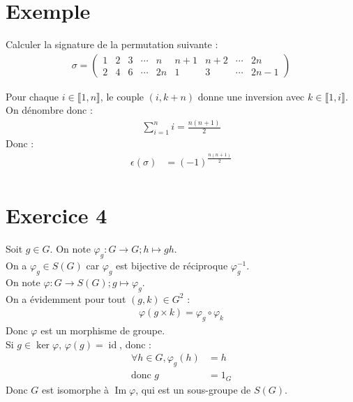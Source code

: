 \documentclass[../main.tex]{subfiles}
\begin{document}
\section{Exemple}
\begin{tcolorbox}[title=Exemple 29.69, title filled=false, colframe=darkgreen, colback=darkgreen!10!white]
    Calculer la signature de la permutation suivante : 
    \begin{align*}
        \sigma = \begin{pmatrix}
            1 & 2 & 3 & \cdots & n & n+1 & n+2 & \cdots & 2n \\
            2 & 4 & 6 & \cdots & 2n & 1 & 3 & \cdots & 2n-1
        \end{pmatrix}
    \end{align*}
\end{tcolorbox}

\noindent Pour chaque $i\in \llbracket 1, n \rrbracket$, le couple $(i, k+n)$ donne une inversion avec $k\in \llbracket 1, i \rrbracket$. \\
On dénombre donc : 
\begin{align*}
    \sum_{i=1}^{n} i = \frac{n(n+1)}{2}
\end{align*}
Donc : 
\begin{align*}
    \epsilon(\sigma) &= (-1)^{\frac{n(n+1)}{2}} \\
\end{align*}

\section*{Exercice 4}
\noindent Soit $g\in G$. On note $\varphi_g:G\to G; h\mapsto gh$. \\
On a $\varphi_g\in S(G)$ car $\varphi_g$ est bijective de réciproque $\varphi_g^{-1}$. \\
On note $\varphi:G\to S(G); g\mapsto \varphi_g$. \\
On a évidemment pour tout $(g, k)\in G^2$ : 
\begin{align*}
    \varphi(g \times k) = \varphi_g \circ \varphi_k
\end{align*}
Donc $\varphi$ est un morphisme de groupe. \\
Si $g\in \ker \varphi$, $\varphi(g) = \operatorname{id}$, donc : 
\begin{align*}
    \forall h\in G, \varphi_g(h) &= h \\
    \text{donc } g &= 1_G
\end{align*}
Donc $G$ est isomorphe à $\operatorname{Im} \varphi$, qui est un sous-groupe de $S(G)$. 
\end{document}
